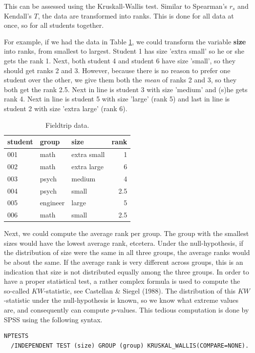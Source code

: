 \documentclass[]{book}\usepackage[]{graphicx}\usepackage[]{color}
\begin{document}
This can be assessed using the Kruskall-Wallis test. Similar to Spearman's $r_s$ and Kendall's $T$, the data are transformed into ranks. This is done for all data at once, so for all students together.

For example, if we had the data in Table \ref{tab:fieldtrip_1}, we could transform the variable \textbf{size} into ranks, from smallest to largest. Student 1 has size 'extra small' so he or she gets the rank 1. Next, both student 4 and student 6 have size 'small', so they should get ranks 2 and 3. However, because there is no reason to prefer one student over the other, we give them both the \textit{mean} of ranks 2 and 3, so they both get the rank 2.5. Next in line is student 3 with size 'medium' and (s)he gets rank 4. Next in line is student 5 with size 'large' (rank 5) and last in line is student 2 with size 'extra large' (rank 6).  


\begin{table}
\label{tab:fieldtrip_1}
\caption{Fieldtrip data.}
 \begin{tabular}{lllr}
 student & group & size & rank\\ \hline
 001 & math & extra small & 1\\
 002 & math & extra large & 6\\
 003 & psych & medium & 4\\
 004 & psych & small & 2.5\\
 005 & engineer & large & 5 \\
 006 & math & small & 2.5 \\
 \end{tabular}
\end{table}


Next, we could compute the average rank per group. The group with the smallest sizes would have the lowest average rank, etcetera. Under the null-hypothesis, if the distribution of size were the same in all three groups, the average ranks would be about the same. If the average rank is very different across groups, this is an indication that size is not distributed equally among the three groups. In order to have a proper statistical test, a rather complex formula is used to compute the so-called $KW$-statistic, see Castellan \& Siegel (1988). The distribution of this $KW$-statistic under the null-hypothesis is known, so we know what extreme values are, and consequently can compute $p$-values. This tedious computation is done by SPSS using the following syntax. 

\begin{verbatim}
NPTESTS 
  /INDEPENDENT TEST (size) GROUP (group) KRUSKAL_WALLIS(COMPARE=NONE).
\end{verbatim}
\end{document}
